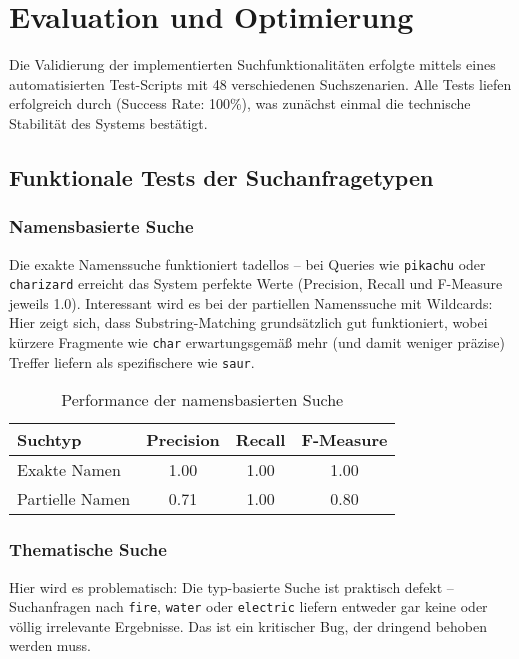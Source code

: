 \section{Evaluation und Optimierung}

Die Validierung der implementierten Suchfunktionalitäten erfolgte mittels eines automatisierten Test-Scripts mit 48 verschiedenen Suchszenarien. Alle Tests liefen erfolgreich durch (Success Rate: 100\%), was zunächst einmal die technische Stabilität des Systems bestätigt.

\subsection{Funktionale Tests der Suchanfragetypen}

\subsubsection{Namensbasierte Suche}

Die exakte Namenssuche funktioniert tadellos -- bei Queries wie \texttt{pikachu} oder \texttt{charizard} erreicht das System perfekte Werte (Precision, Recall und F-Measure jeweils 1.0). Interessant wird es bei der partiellen Namenssuche mit Wildcards: Hier zeigt sich, dass Substring-Matching grundsätzlich gut funktioniert, wobei kürzere Fragmente wie \texttt{char} erwartungsgemäß mehr (und damit weniger präzise) Treffer liefern als spezifischere wie \texttt{saur}.

\begin{table}[h!]
\centering
\begin{tabular}{|l|c|c|c|}
\hline
\textbf{Suchtyp} & \textbf{Precision} & \textbf{Recall} & \textbf{F-Measure} \\
\hline
Exakte Namen & 1.00 & 1.00 & 1.00 \\
Partielle Namen & 0.71 & 1.00 & 0.80 \\
\hline
\end{tabular}
\caption{Performance der namensbasierten Suche}
\end{table}

\subsubsection{Thematische Suche}

Hier wird es problematisch: Die typ-basierte Suche ist praktisch defekt -- Suchanfragen nach \texttt{fire}, \texttt{water} oder \texttt{electric} liefern entweder gar keine oder völlig irrelevante Ergebnisse. Das ist ein kritischer Bug, der dringend behoben werden muss.


